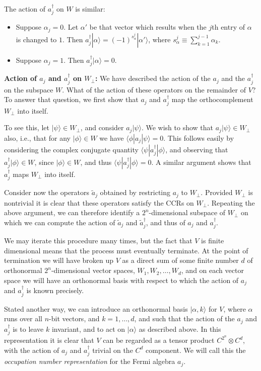 \documentclass[12pt]{article}
\begin{document}
The action of $a_j^\dagger$ on $W$ is similar:
\begin{itemize}
\item Suppose $\alpha_j = 0$.  Let $\alpha'$ be that vector which
  results when the $j$th entry of $\alpha$ is changed to $1$.  Then
  $a_j^\dagger|\alpha\rangle = (-1)^{s_\alpha^j}|\alpha'\rangle$,
  where $s_\alpha^j \equiv \sum_{k=1}^{j-1} \alpha_k$.

\item Suppose $\alpha_j = 1$.  Then $a_j^\dagger |\alpha\rangle = 0$.
\end{itemize}

\textbf{Action of $a_j$ and $a_j^\dagger$ on $W_\perp$:} We have
described the action of the $a_j$ and the $a_j^\dagger$ on the
subspace $W$.  What of the action of these operators on the remainder
of $V$?  To answer that question, we first show that $a_j$ and
$a_j^\dagger$ map the orthocomplement $W_\perp$ into itself.

To see this, let $|\psi\rangle \in W_\perp$, and consider
$a_j|\psi\rangle$.  We wish to show that $a_j|\psi\rangle \in W_\perp$
also, i.e., that for any $|\phi\rangle \in W$ we have $\langle
\phi|a_j|\psi\rangle = 0$.  This follows easily by considering the
complex conjugate quantity $\langle \psi|a_j^\dagger |\phi\rangle$,
and observing that $a_j^\dagger |\phi\rangle \in W$, since
$|\phi\rangle \in W$, and thus $\langle \psi|a_j^\dagger |\phi\rangle
= 0$.  A similar argument shows that $a_j^\dagger$ maps $W_\perp$ into
itself.

Consider now the operators $\tilde a_j$ obtained by restricting $a_j$
to $W_\perp$.  Provided $W_\perp$ is nontrivial it is clear that these
operators satisfy the CCRs on $W_\perp$.  Repeating the above
argument, we can therefore identify a $2^n$-dimensional subspace of
$W_\perp$ on which we can compute the action of $\tilde a_j$ and
$\tilde a_j^\dagger$, and thus of $a_j$ and $a_j^\dagger$.

We may iterate this procedure many times, but the fact that $V$ is
finite dimensional means that the process must eventually terminate.
At the point of termination we will have broken up $V$ as a direct sum
of some finite number $d$ of orthonormal $2^n$-dimensional vector
spaces, $W_1,W_2,\ldots,W_d$, and on each vector space we will have an
orthonormal basis with respect to which the action of $a_j$ and
$a_j^\dagger$ is known precisely.

Stated another way, we can introduce an orthonormal basis
$|\alpha,k\rangle$ for $V$, where $\alpha$ runs over all $n$-bit
vectors, and $k = 1,\ldots,d$, and such that the action of the $a_j$
and $a_j^\dagger$ is to leave $k$ invariant, and to act on
$|\alpha\rangle$ as described above.  In this representation it is
clear that $V$ can be regarded as a tensor product $C^{2^n} \otimes
C^d$, with the action of $a_j$ and $a_j^\dagger$ trivial on the $C^d$
component.  We will call this the \emph{occupation number
  representation} for the Fermi algebra $a_j$.
\end{document}
